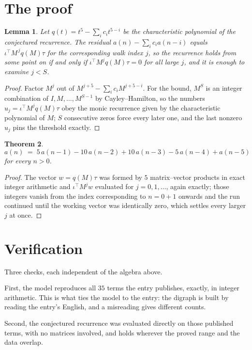 \documentclass[11pt,a4paper]{article}
\theoremstyle{plain}
\newtheorem{theorem}{Theorem}
\newtheorem{lemma}[theorem]{Lemma}
\theoremstyle{definition}
\begin{document}
\section{The proof}

\begin{lemma}\label{lem:crit}
Let $q(t)=t^{5}-\sum_i c_it^{5-i}$ be the characteristic polynomial of the
conjectured recurrence. The residual $a(n)-\sum_ic_ia(n-i)$ equals
$\iota^{\!\top}M^{\,j}q(M)\tau$ for the corresponding walk index $j$, so the recurrence
holds from some point on if and only if $\iota^{\!\top}M^{j}q(M)\tau=0$ for all large $j$,
and it is enough to examine $j<S$.
\end{lemma}

\begin{proof}
Factor $M^{j}$ out of $M^{j+5}-\sum_ic_iM^{j+5-i}$. For the bound, $M^{S}$
is an integer combination of $I,M,\dots,M^{S-1}$ by Cayley--Hamilton, so the numbers
$u_j=\iota^{\!\top}M^{j}q(M)\tau$ obey the monic recurrence given by the characteristic
polynomial of $M$; $S$ consecutive zeros force every later one, and the last nonzero $u_j$
pins the threshold exactly.
\end{proof}

\begin{theorem}
\[
a(n)\;=\;5\,a(n-1) - 10\,a(n-2) + 10\,a(n-3) - 5\,a(n-4) + a(n-5)
\]
for every $n>0$.
\end{theorem}

\begin{proof}
The vector $w=q(M)\tau$ was formed by $5$ matrix--vector products in exact integer
arithmetic and $\iota^{\!\top}M^{j}w$ evaluated for $j=0,1,\dots$, again exactly; those
integers vanish from the index corresponding to $n=0+1$ onwards and the run continued
until the working vector was identically zero, which settles every larger $j$ at once.
\end{proof}

\section{Verification}

Three checks, each independent of the algebra above.

First, the model reproduces all $35$ terms the entry publishes, exactly, in integer
arithmetic. This is what ties the model to the entry: the digraph is built by reading the
entry's English, and a misreading gives different counts.

Second, the conjectured recurrence was evaluated directly on those published terms, with no
matrices involved, and holds wherever the proved range and the data overlap.
\end{document}
